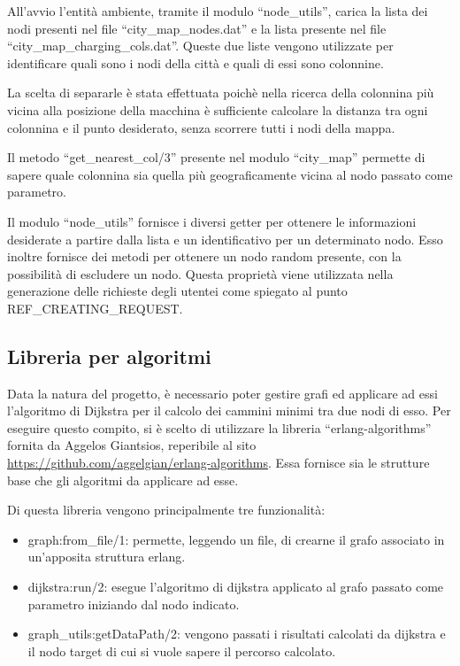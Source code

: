 All'avvio l'entità ambiente, tramite il modulo ``node\_utils'', carica la lista dei nodi presenti nel file ``city\_map\_nodes.dat'' e la lista presente nel file ``city\_map\_charging\_cols.dat''. Queste due liste vengono utilizzate per identificare quali sono i nodi della città e quali di essi sono colonnine. 

La scelta di separarle è stata effettuata poichè nella ricerca della colonnina più vicina alla posizione della macchina è sufficiente calcolare la distanza tra ogni colonnina e il punto desiderato, senza scorrere tutti i nodi della mappa.

Il metodo ``get\_nearest\_col/3'' presente nel modulo ``city\_map'' permette di sapere quale colonnina sia quella più geograficamente vicina al nodo passato come parametro.

Il modulo ``node\_utils'' fornisce i diversi getter per ottenere le informazioni desiderate a partire dalla lista e un identificativo per un determinato nodo. Esso inoltre fornisce dei metodi per ottenere un nodo random presente, con la possibilità di escludere un nodo. Questa proprietà viene utilizzata nella generazione delle richieste degli utentei come spiegato al punto REF\_CREATING\_REQUEST.

\subsection{Libreria per algoritmi} \label{libreria_algoritmi}
Data la natura del progetto, è necessario poter gestire grafi ed applicare ad essi l'algoritmo di Dijkstra per il calcolo dei cammini minimi tra due nodi di esso. Per eseguire questo compito, si è scelto di utilizzare la libreria ``erlang-algorithms'' fornita da Aggelos Giantsios, reperibile al sito \url{https://github.com/aggelgian/erlang-algorithms}. Essa fornisce sia le strutture base che gli algoritmi da applicare ad esse.

Di questa libreria vengono principalmente tre funzionalità:
\begin{itemize}
	\item graph:from\_file/1: permette, leggendo un file, di crearne il grafo associato in un'apposita struttura erlang.
	\item dijkstra:run/2: esegue l'algoritmo di dijkstra applicato al grafo passato come parametro iniziando dal nodo indicato.
	\item graph\_utils:getDataPath/2: vengono passati i risultati calcolati da dijkstra e il nodo target di cui si vuole sapere il percorso calcolato.
\end{itemize}


